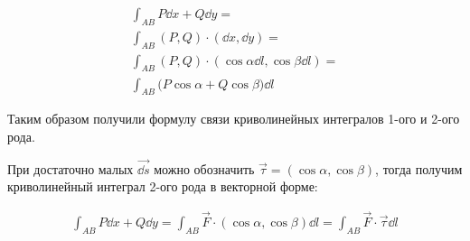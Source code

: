 
\begin{minipage}{\linewidth}
  \begin{multicols}{2}
    
    \columnbreak
  
    \begin{align*}
      \int_{AB} P \dd x + Q \dd y = \\
      \int_{AB} (P, Q) \cdot (\dd x, \dd y) = \\
      \int_{AB} (P, Q) \cdot (\cos \alpha \dd l, \cos \beta \dd l) = \\
      \int_{AB} \Big( P \cos \alpha + Q \cos \beta \Big) \dd l
    \end{align*}
  \end{multicols}
\end{minipage}

Таким образом получили формулу связи криволинейных интегралов 1-ого и 2-ого
рода.

\begin{remark}
  При достаточно малых \(\vec{\dd s}\) можно обозначить
  \(\vec{\tau} = (\cos \alpha, \cos \beta)\),
  тогда получим криволинейный интеграл 2-ого рода в векторной форме:

  \begin{align*}
    \int_{AB} P \dd x + Q \dd y
    = \int_{AB} \vec{F} \cdot (\cos \alpha, \cos \beta) \dd l
    = \int_{AB} \vec{F} \cdot \vec{\tau} \dd l
  \end{align*}
\end{remark}